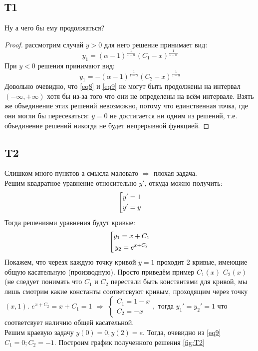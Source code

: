 \documentclass{article}
\begin{document}
\subsection{Т1}
Ну а чего бы ему продолжаться?
\begin{proof}
рассмотрим случай $y>0$ для него решение принимает вид:
\begin{equation}\label{eq8}
    y_1=(\alpha -1)^{\frac{1}{1-\alpha}}(C_1-x)^{\frac{1}{1-\alpha}}
\end{equation}
При $y<0$ решения принимают вид:
\begin{equation}\label{eq9}
    y_1=-(\alpha -1)^{\frac{1}{1-\alpha}}(C_2-x)^{\frac{1}{1-\alpha}}
\end{equation}
 Довольно очевидно, что \ref{eq8} и \ref{eq9} не могут быть продолжены на интервал $(-\infty, + \infty)$ хотя бы из-за того что они не определены на всём интервале. Взять же объединение этих решений невозможно, потому что единственная точка, где они могли бы пересекаться: $y=0$ не достигается ни одним из решений, т.е. объединение решений никогда не будет непрерывной функцией.
\end{proof}
\subsection{T2}
Слишком много пунктов а смысла маловато $\Rightarrow$ плохая задача.\\
Решим квадратное уравнение относительно $y'$, откуда можно получить:
\begin{equation}
    \left[
\begin{gathered}
    y'=1 \\
    y'=y \\
\end{gathered}\\
\right.
\end{equation}
Тогда решениями уравнения будут кривые:
\begin{equation}\label{eq9}
    \left[
\begin{gathered}
    y_1=x+C_1 \\
    y_2=e^{x+C_2} \\
\end{gathered}\\
\right.
\end{equation}
Покажем, что черезх каждую точку кривой $y=1$ проходит 2 кривые, имеющие общую касательную (производную). Просто приведём пример $C_1(x)$ $C_2(x)$(не следует понимать что $C_1$ и $C_2$ перестали быть константами для кривой, мы лишь смотрим какие константы соответсвуют кривым, проходящим через точку $(x,1)$. 
$e^{x+C_2}=x+C_1=1$ $\Rightarrow $
$\begin{cases} 
C_1=1-x \\ 
C_2=-x
\end{cases}, $
 тогда   $y_1'=y_2'=1$ что соответсвует наличию общей касательной.\\
Решим краевую задачу $y(0)=0, y(2)=e$. Тогда, очевидно из \ref{eq9} $C_1=0; C_2=-1$. Построим график полученного решения \ref{fig:T2}
\end{document}
